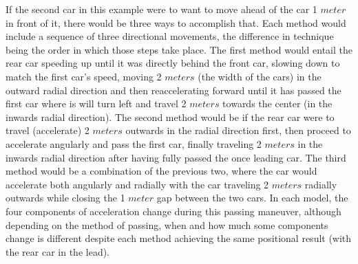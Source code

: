 \documentclass[12pt,a4paper]{article}%
\begin{document}
	If the second car in this example were to want to move ahead of the car 1 $meter$ in front of it, there would be three ways to accomplish that. Each method would include a sequence of three directional movements, the difference in technique being the order in which those steps take place. The first method would entail the rear car speeding up until it was directly behind the front car, slowing down to match the first car's speed, moving 2 $meters$ (the width of the cars) in the outward radial direction and then reaccelerating forward until it has passed the first car where is will turn left and travel 2 $meters$ towards the center (in the inwards radial direction). The second method would be if the rear car were to travel (accelerate) 2 $meters$ outwards in the radial direction first, then proceed to accelerate angularly and pass the first car, finally traveling 2 $meters$ in the inwards radial direction after having fully passed the once leading car. The third method would be a combination of the previous two, where the car would accelerate both angularly and radially with the car traveling 2 $meters$ radially outwards while closing the 1 $meter$ gap between the two cars. In each model, the four components of acceleration change during this passing maneuver, although depending on the method of passing, when and how much some components change is different despite each method achieving the same positional result (with the rear car in the lead). 
	
\end{document}
